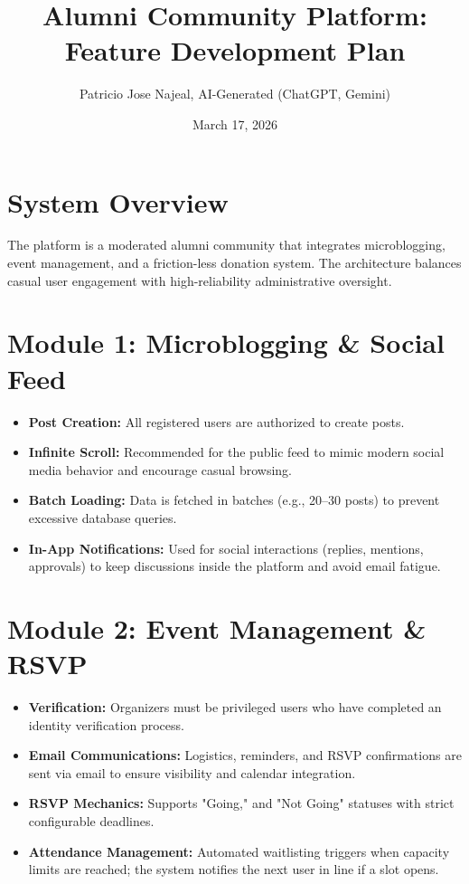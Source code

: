 \documentclass[11pt]{article}
\title{Alumni Community Platform: Feature Development Plan}
\author{Patricio Jose Najeal, AI-Generated (ChatGPT, Gemini)}
\date{March 17, 2026}
\begin{document}
\maketitle

\section{System Overview}
The platform is a moderated alumni community that integrates microblogging, event management, and a friction-less donation system. The architecture balances casual user engagement with high-reliability administrative oversight.

\section{Module 1: Microblogging \& Social Feed}
\begin{itemize}
    \item \textbf{Post Creation:} All registered users are authorized to create posts.
    \item \textbf{Infinite Scroll:} Recommended for the public feed to mimic modern social media behavior and encourage casual browsing.
    \item \textbf{Batch Loading:} Data is fetched in batches (e.g., 20--30 posts) to prevent excessive database queries.
    \item \textbf{In-App Notifications:} Used for social interactions (replies, mentions, approvals) to keep discussions inside the platform and avoid email fatigue.
\end{itemize}

\section{Module 2: Event Management \& RSVP}
\begin{itemize}
    \item \textbf{Verification:} Organizers must be privileged users who have completed an identity verification process.
    \item \textbf{Email Communications:} Logistics, reminders, and RSVP confirmations are sent via email to ensure visibility and calendar integration.
    \item \textbf{RSVP Mechanics:} Supports "Going," and "Not Going" statuses with strict configurable deadlines.
    \item \textbf{Attendance Management:} Automated waitlisting triggers when capacity limits are reached; the system notifies the next user in line if a slot opens.
\end{itemize}
\end{document}
